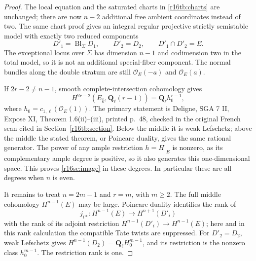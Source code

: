 \begin{proof}
The local equation and the saturated charts in
\eqref{r16tb:charts} are unchanged; there are now $n-2$
additional free ambient coordinates instead of two.
The same chart proof gives an integral regular projective
strictly semistable model with exactly two reduced components
\[
 D'_1=\operatorname{Bl}_{\Sigma}D_1,\qquad D'_2=D_2,
                       \qquad D'_1\cap D'_2=E.
 \tag{SC16.10}\label{r16sc:general-model}
\]
The exceptional locus over $\Sigma$ has dimension $n-1$
and codimension two in the total model, so it is not an
additional special-fiber component. The normal bundles along
the double stratum are still $\mathcal O_E(-a)$ and
$\mathcal O_E(a)$.

If $2r-2\ne n-1$, smooth complete-intersection cohomology
gives
\[
 H^{2r-2}(E_{\bar k},\mathbf Q_\ell(r-1))
                         =\mathbf Q_\ell h_0^{r-1},
 \tag{SC16.11}\label{r16sc:nonmiddle}
\]
where $h_0=c_{1,\ell}(\mathcal O_E(1))$.
The primary statement is Deligne, SGA 7 II, Expose XI,
Theorem 1.6(ii)--(iii), printed p.~48, checked in the
original French scan cited in Section~\ref{r16tb:section}.
Below the middle it is weak Lefschetz; above the middle
the stated theorem, or Poincare duality, gives the same
rational generator. The power of any ample restriction
$h=H|_E$ is nonzero, as its complementary ample degree
is positive, so it also generates this one-dimensional
space. This proves \eqref{r16sc:image} in these degrees.
In particular these are all degrees when $n$ is even.

It remains to treat $n=2m-1$ and $r=m$, with $m\geq2$.
The full middle cohomology $H^{n-1}(E)$ may be large.
Poincare duality identifies the rank of
\[
 j_{i*}:H^{n-1}(E)\longrightarrow H^{n+1}(D'_i)
\]
with the rank of its adjoint restriction
$H^{n-1}(D'_i)\to H^{n-1}(E)$; here and in this rank
calculation the compatible Tate twists are suppressed.
For $D'_2=D_2$, weak Lefschetz gives
$H^{n-1}(D_2)=\mathbf Q_\ell H_0^{m-1}$, and its restriction
is the nonzero class $h_0^{m-1}$. The restriction rank is one.


\end{proof}
